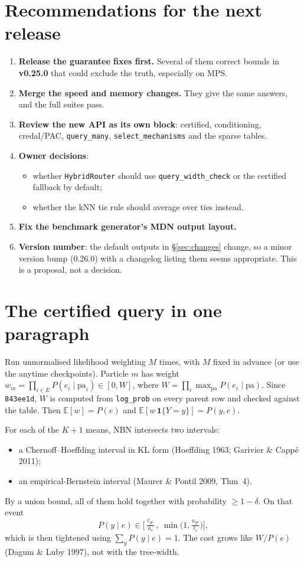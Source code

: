 \documentclass[10pt,a4paper]{article}
\newcommand{\code}[1]{\texttt{#1}}
\newcommand{\old}{\textbf{v0.25.0}}
\begin{document}
\section{Recommendations for the next release}
\begin{enumerate}
\item \textbf{Release the guarantee fixes first.} Several of them correct bounds in \old{}
that could exclude the truth, especially on MPS.
\item \textbf{Merge the speed and memory changes.} They give the same answers, and the full
suites pass.
\item \textbf{Review the new API as its own block}: certified, conditioning, credal/PAC,
\code{query\_many}, \code{select\_mechanisms} and the sparse tables.
\item \textbf{Owner decisions}:
  \begin{itemize}
  \item whether \code{HybridRouter} should use \code{query\_width\_check} or the certified fallback by default;
  \item whether the kNN tie rule should average over ties instead.
  \end{itemize}
\item \textbf{Fix the benchmark generator's MDN output layout.}
\item \textbf{Version number}: the default outputs in §\ref{sec:changes} change, so a minor version bump (0.26.0) with a changelog listing them seems appropriate. This is a proposal, not a decision.
\end{enumerate}

\appendix
\section{The certified query in one paragraph}\label{app:cert}
Run unnormalised likelihood weighting $M$ times, with $M$ fixed in advance (or use the anytime
checkpoints). Particle $m$ has weight $w_m=\prod_{i\in E}P(e_i\mid\mathrm{pa}_i)\in[0,W]$, where
$W=\prod_i\max_{\mathrm{pa}}P(e_i\mid\mathrm{pa})$. Since \code{843ee1d}, $W$ is computed from
\code{log\_prob} on every parent row and checked against the table. Then
$\mathbb E[w]=P(e)$ and $\mathbb E[w\,\mathbf 1\{Y=y\}]=P(y,e)$.

For each of the $K+1$ means, NBN intersects two intervals:
\begin{itemize}
\item a Chernoff--Hoeffding interval in KL form (Hoeffding 1963; Garivier \& Cappé 2011);
\item an empirical-Bernstein interval (Maurer \& Pontil 2009, Thm~4).
\end{itemize}
By a union bound, all of them hold together with probability $\ge1-\delta$. On that event
\[ P(y\mid e)\in\Big[\tfrac{\ell_{ye}}{u_e},\ \min\big(1,\tfrac{u_{ye}}{\ell_e}\big)\Big], \]
which is then tightened using $\sum_yP(y\mid e)=1$. The cost grows like $W/P(e)$ (Dagum \& Luby
1997), not with the tree-width.
\end{document}
